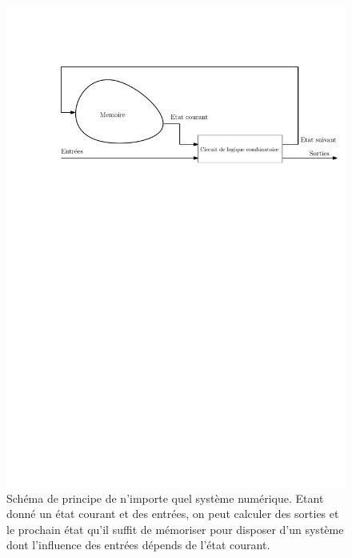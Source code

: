 \begin{figure}[htbp]
\centering\includegraphics[width=0.75\linewidth]{Figs/intro_seq.pdf}
\caption{\label{fig:intro_seq} Schéma de principe de n'importe quel système numérique. Etant donné un état courant et des entrées, on peut calculer des sorties et le prochain état qu'il suffit de mémoriser pour disposer d'un système dont l'influence des entrées dépends de l'état courant.}
\end{figure}






